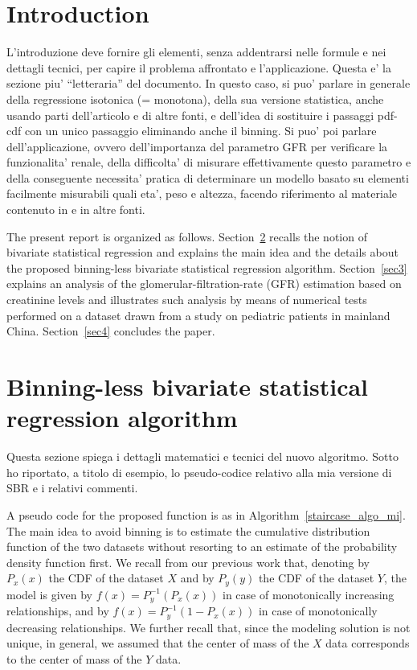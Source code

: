 \documentclass[10pt,final]{siamltex}
\begin{document}
\section{Introduction}
%
{{\red L'introduzione deve fornire gli elementi, senza addentrarsi nelle formule e nei dettagli tecnici, per capire il problema affrontato e l'applicazione. Questa e' la sezione piu' ``letteraria'' del documento. In questo caso, si puo' parlare in generale della regressione isotonica (= monotona), della sua versione statistica, anche usando parti dell'articolo \cite{fiori} e di altre fonti, e dell'idea di sostituire i passaggi pdf-cdf con un unico passaggio eliminando anche il binning. Si puo' poi parlare dell'applicazione, ovvero dell'importanza del parametro GFR per verificare la funzionalita' renale, della difficolta' di misurare effettivamente questo parametro e della conseguente necessita' pratica di determinare un modello basato su elementi facilmente misurabili quali eta', peso e altezza, facendo riferimento al materiale contenuto in \cite{gfr_plos_one} e in altre fonti.}

The present report is organized as follows. Section~\ref{sec2} recalls the notion of bivariate statistical regression and explains the main idea and the details about the proposed binning-less bivariate statistical regression algorithm. Section~\ref{sec3} explains an analysis of the glomerular-filtration-rate (GFR) estimation based on creatinine levels and illustrates such analysis by means of numerical tests performed on a dataset drawn from a study on pediatric patients in mainland China. Section~\ref{sec4} concludes the paper.
%
\section{Binning-less bivariate statistical regression algorithm}\label{sec2}
%
{{\red Questa sezione spiega i dettagli matematici e tecnici del nuovo algoritmo. Sotto ho riportato, a titolo di esempio, lo pseudo-codice relativo alla mia versione di SBR e i relativi commenti.}

A pseudo code for the proposed function is as in Algorithm~\ref{staircase_algo_mi}. The main idea to avoid binning is to estimate the cumulative distribution function of the two datasets without resorting to an estimate of the probability density function first. We recall from our previous work that, denoting by $P_x(x)$ the CDF of the dataset $X$ and by $P_y(y)$ the CDF of the dataset $Y$, the model is given by $f(x)=P_y^{-1}(P_x(x))$ in case of monotonically increasing relationships, and by $f(x)=P_y^{-1}(1-P_x(x))$ in case of monotonically decreasing relationships. We further recall that, since the modeling solution is not unique, in general, we assumed that the center of mass of the $X$ data corresponds to the center of mass of the $Y$ data.

}}
\end{document}
